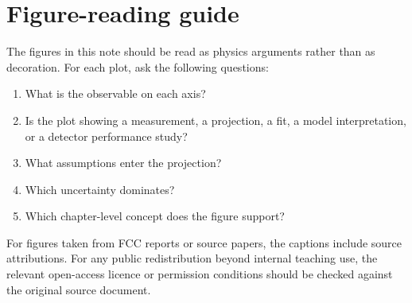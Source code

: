 \documentclass[11pt,a4paper]{article}
\numberwithin{equation}{section}
\begin{document}
\section{Figure-reading guide}
The figures in this note should be read as physics arguments rather than as decoration. For each plot, ask the following questions:
\begin{enumerate}[leftmargin=1.6em]
\item What is the observable on each axis?
\item Is the plot showing a measurement, a projection, a fit, a model interpretation, or a detector performance study?
\item What assumptions enter the projection?
\item Which uncertainty dominates?
\item Which chapter-level concept does the figure support?
\end{enumerate}
For figures taken from FCC reports or source papers, the captions include source attributions. For any public redistribution beyond internal teaching use, the relevant open-access licence or permission conditions should be checked against the original source document.
\end{document}

